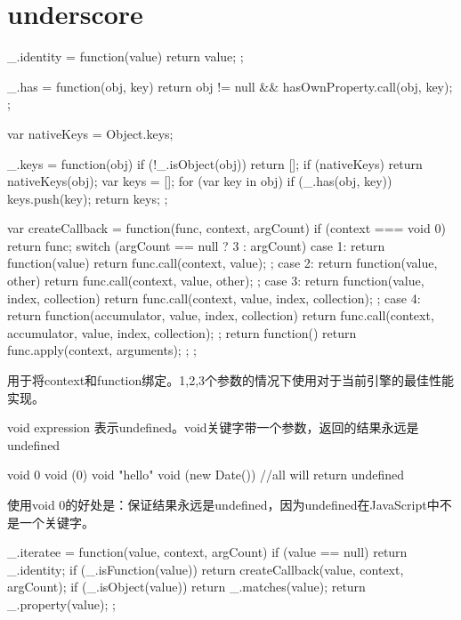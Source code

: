 \section{underscore}

\begin{JavaScript}
  _.identity = function(value) {
    return value;
  };
  
  _.has = function(obj, key) {
    return obj != null && hasOwnProperty.call(obj, key);
  }; 
  
\end{JavaScript}

\begin{JavaScript}
  var nativeKeys = Object.keys;
  
  _.keys = function(obj) {
    if (!_.isObject(obj)) return [];
    if (nativeKeys) return nativeKeys(obj);
    var keys = [];
    for (var key in obj) if (_.has(obj, key)) keys.push(key);
    return keys;
  };  
\end{JavaScript}

\begin{JavaScript}
  var createCallback = function(func, context, argCount) {
    if (context === void 0) return func;
    switch (argCount == null ? 3 : argCount) {
      case 1: return function(value) {
        return func.call(context, value);
      };
      case 2: return function(value, other) {
        return func.call(context, value, other);
      };
      case 3: return function(value, index, collection) {
        return func.call(context, value, index, collection);
      };
      case 4: return function(accumulator, value, index, collection) {
        return func.call(context, accumulator, value, index, collection);
      };
    }
    return function() {
      return func.apply(context, arguments);
    };
  };
\end{JavaScript}

用于将context和function绑定。1,2,3个参数的情况下使用对于当前引擎的最佳性能实现。

void expression 表示undefined。void关键字带一个参数，返回的结果永远是undefined
\begin{JavaScript}
  void 0
  void (0)
  void "hello"
  void (new Date())
//all will return undefined
\end{JavaScript}
使用void 0的好处是：保证结果永远是undefined，因为undefined在JavaScript中不是一个关键字。


\begin{JavaScript}
  _.iteratee = function(value, context, argCount) {
    if (value == null) return _.identity;
    if (_.isFunction(value)) return createCallback(value, context, argCount);
    if (_.isObject(value)) return _.matches(value);
    return _.property(value);
  };
\end{JavaScript}


